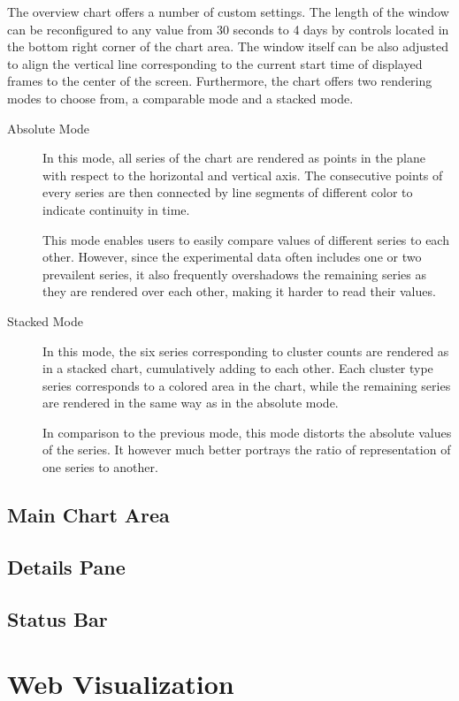 The overview chart offers a number of custom settings. The length of the window can be reconfigured to any value from 30 seconds to 4 days by controls located in the bottom right corner of the chart area. The window itself can be also adjusted to align the vertical line corresponding to the current start time of displayed frames to the center of the screen. Furthermore, the chart offers two rendering modes to choose from, a comparable mode and a stacked mode.

\begin{description}
	\item[Absolute Mode]
	In this mode, all series of the chart are rendered as points in the plane with respect to the horizontal and vertical axis. The consecutive points of every series are then connected by line segments of different color to indicate continuity in time.

	This mode enables users to easily compare values of different series to each other. However, since the experimental data often includes one or two prevailent series, it also frequently overshadows the remaining series as they are rendered over each other, making it harder to read their values.

	\item[Stacked Mode]
	In this mode, the six series corresponding to cluster counts are rendered as in a stacked chart, cumulatively adding to each other. Each cluster type series corresponds to a colored area in the chart, while the remaining series are rendered in the same way as in the absolute mode.

	In comparison to the previous mode, this mode distorts the absolute values of the series. It however much better portrays the ratio of representation of one series to another.
\end{description}

\subsection{Main Chart Area}


\subsection{Details Pane}
\subsection{Status Bar}

\section{Web Visualization}
\label{chapter:web-visualization}

